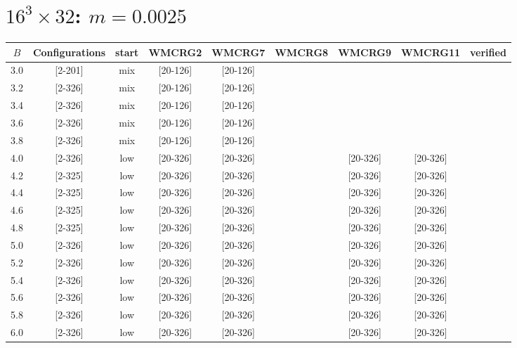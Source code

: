\documentclass{article}
\begin{document}
  \section*{$16^3\times32$:  $m=0.0025$}
    \begin{tabular}{| c | c | c | c | c | c | c | c | c |}
      \hline
      $B$ & Configurations & start & WMCRG2 & WMCRG7 & WMCRG8 & WMCRG9 & WMCRG11 & verified\\
      \hline
      3.0 & [2-201] & mix & [20-126] & [20-126] &  &  &  &\\
      3.2 & [2-326] & mix & [20-126] & [20-126] &  &  &  &\\
      3.4 & [2-326] & mix & [20-126] & [20-126] &  &  &  &\\
      3.6 & [2-326] & mix & [20-126] & [20-126] &  &  &  &\\
      3.8 & [2-326] & mix & [20-126] & [20-126] &  &  &  &\\
      4.0 & [2-326] & low & [20-326] & [20-326] &  & [20-326] & [20-326] &\\
      4.2 & [2-325] & low & [20-326] & [20-326] &  & [20-326] & [20-326] &\\
      4.4 & [2-325] & low & [20-326] & [20-326] &  & [20-326] & [20-326] &\\
      4.6 & [2-325] & low & [20-326] & [20-326] &  & [20-326] & [20-326] &\\
      4.8 & [2-325] & low & [20-326] & [20-326] &  & [20-326] & [20-326] &\\
      5.0 & [2-326] & low & [20-326] & [20-326] &  & [20-326] & [20-326] &\\
      5.2 & [2-326] & low & [20-326] & [20-326] &  & [20-326] & [20-326] &\\
      5.4 & [2-326] & low & [20-326] & [20-326] &  & [20-326] & [20-326] &\\
      5.6 & [2-326] & low & [20-326] & [20-326] &  & [20-326] & [20-326] &\\
      5.8 & [2-326] & low & [20-326] & [20-326] &  & [20-326] & [20-326] &\\
      6.0 & [2-326] & low & [20-326] & [20-326] &  & [20-326] & [20-326] &\\
      \hline
    \end{tabular}
\end{document}
